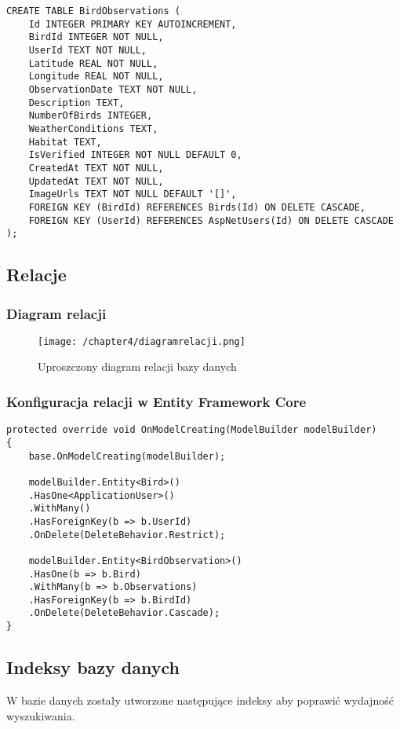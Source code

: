 \begin{lstlisting}[style=sqlstyle, caption={Struktura tabeli AspNetRoles}]
CREATE TABLE BirdObservations (
	Id INTEGER PRIMARY KEY AUTOINCREMENT,
	BirdId INTEGER NOT NULL,
	UserId TEXT NOT NULL,
	Latitude REAL NOT NULL,
	Longitude REAL NOT NULL,
	ObservationDate TEXT NOT NULL,
	Description TEXT,
	NumberOfBirds INTEGER,
	WeatherConditions TEXT,
	Habitat TEXT,
	IsVerified INTEGER NOT NULL DEFAULT 0,
	CreatedAt TEXT NOT NULL,
	UpdatedAt TEXT NOT NULL,
	ImageUrls TEXT NOT NULL DEFAULT '[]',
	FOREIGN KEY (BirdId) REFERENCES Birds(Id) ON DELETE CASCADE,
	FOREIGN KEY (UserId) REFERENCES AspNetUsers(Id) ON DELETE CASCADE
);
\end{lstlisting}

\newpage

\subsection{Relacje}

\subsubsection{Diagram relacji}

\begin{figure}[!htb]
	\centering
	\texttt{[image: /chapter4/diagramrelacji.png]}
	\caption{Uproszczony diagram relacji bazy danych}
	\label{fig:diagramrelacji}
\end{figure}

\subsubsection{Konfiguracja relacji w Entity Framework Core}

\begin{lstlisting}[style=csharp, caption={Konfiguracja relacji w Entity Framework Core}]
protected override void OnModelCreating(ModelBuilder modelBuilder)
{
	base.OnModelCreating(modelBuilder);
	
	modelBuilder.Entity<Bird>()
	.HasOne<ApplicationUser>()
	.WithMany()
	.HasForeignKey(b => b.UserId)
	.OnDelete(DeleteBehavior.Restrict);
	
	modelBuilder.Entity<BirdObservation>()
	.HasOne(b => b.Bird)
	.WithMany(b => b.Observations)
	.HasForeignKey(b => b.BirdId)
	.OnDelete(DeleteBehavior.Cascade);
}
\end{lstlisting}

\subsection{Indeksy bazy danych}
W bazie danych zostały utworzone następujące indeksy aby poprawić wydajność wyszukiwania.

